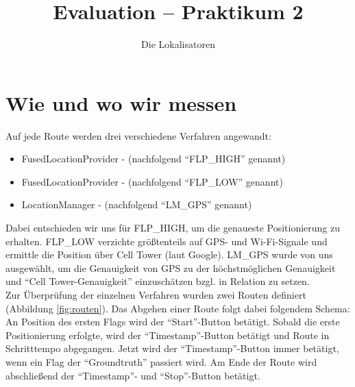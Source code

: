 

\title{Evaluation -- Praktikum 2}
\author{Die Lokalisatoren}

\ihead{}
\chead{}
\ohead{}
\ifoot{}
\cfoot{\pagemark}
\ofoot{}



\setlength{\parskip}{0em}
\setlength{\parindent}{0em}
\renewcommand{\baselinestretch}{1.15}



\docheader

\section{Wie und wo wir messen}

Auf jede Route werden drei verschiedene Verfahren angewandt: 
\begin{itemize}
	\item FusedLocationProvider -  (nachfolgend "`FLP\_HIGH"' genannt)
	\item FusedLocationProvider -  (nachfolgend "`FLP\_LOW"' genannt)
	\item LocationManager -  (nachfolgend "`LM\_GPS"' genannt)
\end{itemize}

Dabei entschieden wir uns für FLP\_HIGH, um die genaueste Positionierung zu erhalten. FLP\_LOW verzichte größtenteils auf GPS- und Wi-Fi-Signale und ermittle die Position über Cell Tower (laut Google). LM\_GPS wurde von uns ausgewählt, um die Genauigkeit von GPS zu der höchstmöglichen Genauigkeit und "`Cell Tower-Genauigkeit"' einzuschätzen bzgl. in Relation zu setzen. \\

Zur Überprüfung der einzelnen Verfahren wurden zwei Routen definiert (Abbildung \ref{fig:routen}). Das Abgehen einer Route folgt dabei folgendem Schema: An Position des ersten Flags wird der "`Start"'-Button betätigt. Sobald die erste Positionierung erfolgte, wird der "`Timestamp"'-Button betätigt und Route in Schritttempo abgegangen. Jetzt wird der "`Timestamp"'-Button immer betätigt, wenn ein Flag der "`Groundtruth"' passiert wird. Am Ende der Route wird abschließend der "`Timestamp"'- und "`Stop"'-Button betätigt.

